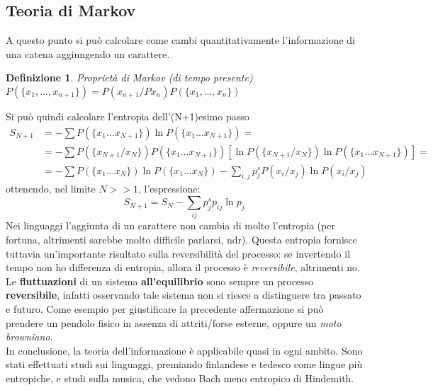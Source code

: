 \documentclass[12pt, a4paper]{book}
\theoremstyle{theorem}
\newtheorem{definition}{Definizione}[section]
\begin{document}
			\subsection{Teoria di Markov}
				A questo punto si può calcolare come cambi quantitativamente l'informazione di una catena aggiungendo un carattere.
				\begin{definition}
					Proprietà di Markov (di tempo presente)\\
					$P(\{x_1,...,x_{n+1}\})=P(x_{n+1}/Px_n)P(\{x_1,...,x_{n}\})$
				\end{definition}
				Si può quindi calcolare l'entropia dell'(N+1)esimo passo
				\begin{equation*}
					\begin{split}
						S_{N+1}&=-\sum P\left(\{x_{1}\ldots x_{N+1}\}\right)\ln P\left(\{x_{1}\ldots x_{N+1}\}\right)=\\
						&=-\sum P\left(\{x_{N+1}/x_{N}\}\right)P\left(\{x_{1}\ldots x_{N+1}\}\right)\left[\ln P\left(\{x_{N+1}/x_{N}\}\right)\ln P\left(\{x_{1}\ldots x_{N+1}\}\right)\right]=\\
						&=-\sum P\left(\{x_{1}\ldots x_{N}\}\right)\ln P\left(\{x_{1}\ldots x_{N}\}\right)-\sum_{i,j}p_j^sP\left(x_i/x_j\right)\ln P\left(x_i/x_j\right)
					\end{split}
				\end{equation*}
				ottenendo, nel limite $N>>1$, l'espressione: 
				\begin{equation}
					S_{N+1}=S_N-\sum_{ij}p_j^sp_{ij}\ln p_j
				\end{equation}
				Nei linguaggi l'aggiunta di un carattere non cambia di molto l'entropia (per fortuna, altrimenti sarebbe molto difficile parlarsi, ndr).
				Questa entropia fornisce tuttavia un'importante risultato sulla reversibilità del processo:
				se invertendo il tempo non ho differenza di entropia, allora il processo è \textit{reversibile}, altrimenti no.
				Le \textbf{fluttuazioni} di un sistema \textbf{all'equilibrio} sono sempre un processo \textbf{reversibile}, infatti osservando tale sistema non si riesce a distinguere tra passato e futuro.
				Come esempio per giustificare la precedente affermazione si può prendere un pendolo fisico in assenza di attriti/forse esterne, oppure un \textit{moto browniano}.\\
				In conclusione, la teoria dell'informazione è applicabile quasi in ogni ambito.
				Sono stati effettuati studi sui linguaggi, premiando finlandese e tedesco come lingue più entropiche, e studi sulla musica, che vedono Bach meno entropico di Hindemith.
		
\end{document}
